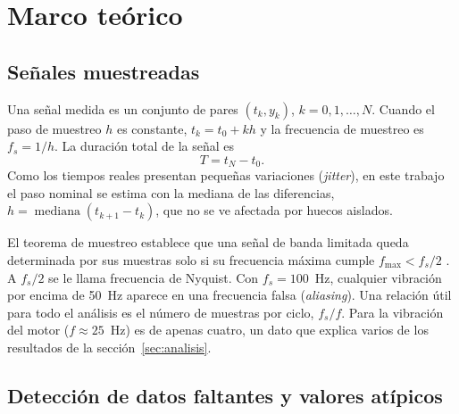 \section{Marco teórico}

\subsection{Señales muestreadas}

Una señal medida es un conjunto de pares $(t_k, y_k)$, $k = 0,1,\dots,N$. Cuando el paso de muestreo $h$ es constante, $t_k = t_0 + kh$ y la frecuencia de muestreo es $f_s = 1/h$. La duración total de la señal es
\begin{equation}
  T = t_N - t_0 .
  \label{eq:duracion}
\end{equation}
Como los tiempos reales presentan pequeñas variaciones (\textit{jitter}), en este trabajo el paso nominal se estima con la mediana de las diferencias, $h = \operatorname{mediana}(t_{k+1} - t_k)$, que no se ve afectada por huecos aislados.

El teorema de muestreo establece que una señal de banda limitada queda determinada por sus muestras solo si su frecuencia máxima cumple $f_{\max} < f_s/2$ \parencite{shannon1949}. A $f_s/2$ se le llama frecuencia de Nyquist. Con $f_s = 100$~Hz, cualquier vibración por encima de 50~Hz aparece en una frecuencia falsa (\textit{aliasing}). Una relación útil para todo el análisis es el número de muestras por ciclo, $f_s/f$. Para la vibración del motor ($f \approx 25$~Hz) es de apenas cuatro, un dato que explica varios de los resultados de la sección~\ref{sec:analisis}.

\subsection{Detección de datos faltantes y valores atípicos}

